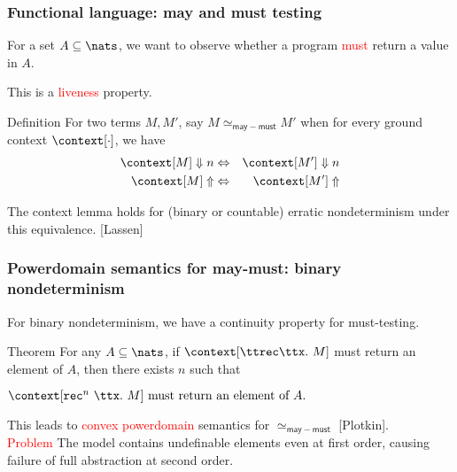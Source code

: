 \documentclass{beamer}
\newcommand{\maymust}{\mathsf{may-must}}
\newcommand{\recapp}[3]{\mathtt{rec}^{{#1}}\ {#2}}
\newcommand{\red}[1]{\textcolor{red}{#1}}
\begin{document}

\begin{frame}\frametitle{Functional language: may and must testing}


For a set $A \subseteq \nats$, we want to observe whether a program \red{must} return a value in $A$.
 
\medskip

This is a \red{liveness} property.

\begin{block}{Definition}
  For two terms $M,M'$, say $M \simeq_{\maymust} M'$ when for every ground
  context $\context[\cdot]$, we have
\begin{eqnarray*}
  \context[M] \Downarrow n & \Leftrightarrow & \context[M'] \Downarrow n \\
  \context[M] \Uparrow & \Leftrightarrow & \context[M'] \Uparrow
\end{eqnarray*}
\end{block}

The context lemma holds for (binary or countable) erratic nondeterminism under this equivalence. [Lassen]


\end{frame}



\begin{frame}\frametitle{Powerdomain semantics for may-must: binary nondeterminism}



For binary nondeterminism, we have a continuity property for must-testing.

\begin{block}{Theorem}
  For any $A \subseteq \nats$, if $\context[\ttrec \ttx.\ M]$ must return an
  element of $A$, then there exists $n$ such that

\begin{math}
  \context[\recapp{n}{\ttx.\ M}{N}] \mbox{ must return an element of $A$.}
\end{math}
\end{block}
\medskip
This leads to \red{convex powerdomain} semantics for $\simeq_{\maymust}$ [Plotkin]. \\
\medskip \pause
\red{Problem} The model contains undefinable elements even at first order, causing failure of full abstraction at second order.


\end{frame}
\end{document}

